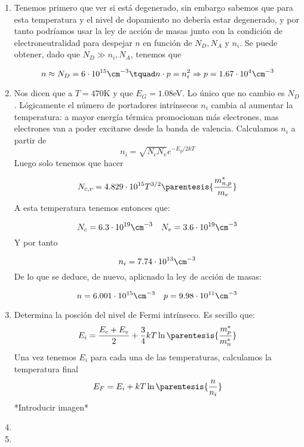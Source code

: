 	\begin{enumerate}[label=\alph*)]
		\item Tenemos primero que ver si está degenerado, sin embargo sabemos que para esta temperatura y el nivel de dopamiento no debería estar degenerado, y por tanto podríamos usar la ley de acción de masas junto con la condición de electroneutralidad para despejar $n$ en función de $N_D,N_A$ y $n_i$. Se puede obtener, dado que $N_D \gg n_i,N_A$, tenemos que

		      \begin{equation}
			      n\approx N_D = 6\cdot 10^{15} \cm^{-3} \tquad n\cdot p = n_i^2 \Rightarrow p = 1.67 \cdot 10^4 \cm^{-3}
		      \end{equation}
		\item Nos dicen que a $T=470$K y que $E_G=1.08$eV. Lo único que no cambio es $N_D$. Lógicamente el número de portadores intrínsecos $n_i$ cambia al aumentar la temperatura: a mayor energía térmica promocionan más electrones, mas electrones van a poder excitarse desde la banda de valencia. Calculamos $n_i$ a partir de
		      \begin{equation}
			      n_i = \sqrt{N_cN_v} e^{-E_g/2kT}
		      \end{equation}
		      Luego solo tenemos que hacer

		      \begin{equation}
			      N_{c,v} = 4.829\cdot 10^{15} T^{3/2} \parentesis{\frac{m_{n,p}^*}{m_e}}
		      \end{equation}
		      A esta temperatura tenemos entonces que:

		      \begin{equation}
			      N_c = 6.3 \cdot 10^{19} \cm^{-3} \quad N_v = 3.6 \cdot 10^{19} \cm^{-3}
		      \end{equation}
		      Y por tanto

		      \begin{equation}
			      n_i = 7.74 \cdot 10^{13} \cm^{-3}
		      \end{equation}
		      De lo que se deduce, de nuevo, aplicnado la ley de acción de masas:

		      \begin{equation}
			      n=6.001 \cdot 10^{15} \cm^{-3} \quad p = 9.98 \cdot 10^{11} \cm^{-3}
		      \end{equation}
		\item Determina la posción del nivel de Fermi intrínseco. Es secillo que:
		      \begin{equation}
			      E_i = \frac{E_c + E_v}{2} + \frac{3}{4} kT \ln \parentesis{\frac{m_p^*}{m_n^*}}
		      \end{equation}
		      Una vez tenemos $E_i$ para cada una de las temperaturas, calculamos la temperatura final
		      \begin{equation}
			      E_F = E_i + kT \ln \parentesis{\frac{n}{n_i}}
		      \end{equation}
		      *Introducir imagen*
		\item
		\item
	\end{enumerate}



